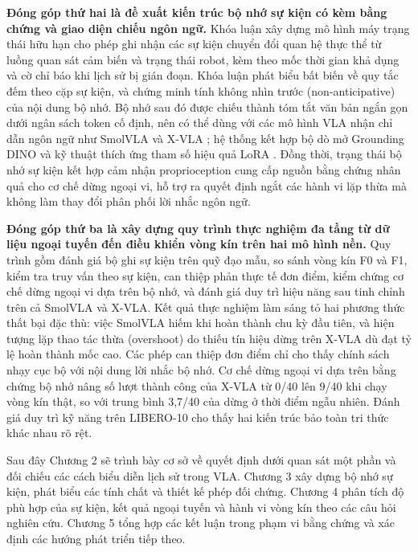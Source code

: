 \textbf{Đóng góp thứ hai là đề xuất kiến trúc bộ nhớ sự kiện có kèm bằng chứng và giao diện chiếu ngôn ngữ.} Khóa luận xây dựng mô hình máy trạng thái hữu hạn cho phép ghi nhận các sự kiện chuyển đổi quan hệ thực thể từ luồng quan sát cảm biến và trạng thái robot, kèm theo mốc thời gian khả dụng và cờ chỉ báo khi lịch sử bị gián đoạn. Khóa luận phát biểu bất biến về quy tắc đếm theo cặp sự kiện, và chứng minh tính không nhìn trước (non-anticipative) của nội dung bộ nhớ. Bộ nhớ sau đó được chiếu thành tóm tắt văn bản ngắn gọn dưới ngân sách token cố định, nên có thể dùng với các mô hình VLA nhận chỉ dẫn ngôn ngữ như SmolVLA \cite{smolvla2025} và X-VLA \cite{xvla2025}; hệ thống kết hợp bộ dò mở Grounding DINO \cite{groundingdino2024} và kỹ thuật thích ứng tham số hiệu quả LoRA \cite{lora2021}. Đồng thời, trạng thái bộ nhớ sự kiện kết hợp cảm nhận proprioception cung cấp nguồn bằng chứng nhân quả cho cơ chế dừng ngoại vi, hỗ trợ ra quyết định ngắt các hành vi lặp thừa mà không làm thay đổi phân phối lời nhắc ngôn ngữ.

\textbf{Đóng góp thứ ba là xây dựng quy trình thực nghiệm đa tầng từ dữ liệu ngoại tuyến đến điều khiển vòng kín trên hai mô hình nền.} Quy trình gồm đánh giá bộ ghi sự kiện trên quỹ đạo mẫu, so sánh vòng kín F0 và F1, kiểm tra truy vấn theo sự kiện, can thiệp phản thực tế đơn điểm, kiểm chứng cơ chế dừng ngoại vi dựa trên bộ nhớ, và đánh giá duy trì hiệu năng sau tinh chỉnh trên cả SmolVLA và X-VLA. Kết quả thực nghiệm làm sáng tỏ hai phương thức thất bại đặc thù: việc SmolVLA hiếm khi hoàn thành chu kỳ đầu tiên, và hiện tượng lặp thao tác thừa (overshoot) do thiếu tín hiệu dừng trên X-VLA dù đạt tỷ lệ hoàn thành mốc cao. Các phép can thiệp đơn điểm chỉ cho thấy chính sách nhạy cục bộ với nội dung lời nhắc bộ nhớ. Cơ chế dừng ngoại vi dựa trên bằng chứng bộ nhớ nâng số lượt thành công của X-VLA từ 0/40 lên 9/40 khi chạy vòng kín thật, so với trung bình 3,7/40 của dừng ở thời điểm ngẫu nhiên. Đánh giá duy trì kỹ năng trên LIBERO-10 cho thấy hai kiến trúc bảo toàn tri thức khác nhau rõ rệt.

Sau đây Chương 2 sẽ trình bày cơ sở về quyết định dưới quan sát một phần và đối chiếu các cách biểu diễn lịch sử trong VLA. Chương 3 xây dựng bộ nhớ sự kiện, phát biểu các tính chất và thiết kế phép đối chứng. Chương 4 phân tích độ phù hợp của sự kiện, kết quả ngoại tuyến và hành vi vòng kín theo các câu hỏi nghiên cứu. Chương 5 tổng hợp các kết luận trong phạm vi bằng chứng và xác định các hướng phát triển tiếp theo.
